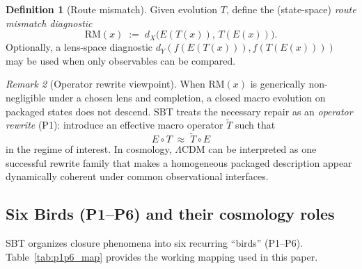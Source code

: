 \documentclass[11pt]{article}
\newcommand{\StateSpace}{X}
\newcommand{\ObsSpace}{Y}
\newcommand{\Lens}{f}              \newcommand{\Completion}{U}        \newcommand{\PackageOp}{E}
\newcommand{\RM}{\mathrm{RM}}      \newcommand{\iddef}{\delta}
\theoremstyle{definition}
\newtheorem{definition}{Definition}[section]
\theoremstyle{plain}
\theoremstyle{remark}
\newtheorem{remark}[definition]{Remark}
\begin{document}
\begin{definition}[Route mismatch]
Given evolution $T$, define the (state-space) \emph{route mismatch diagnostic}
\begin{equation}
\RM(x) \;:=\; d_{\StateSpace}\!\big(\PackageOp(T(x)),\,T(\PackageOp(x))\big).
\label{eq:route_mismatch_def}
\end{equation}
Optionally, a lens-space diagnostic $d_{\ObsSpace}(\Lens(\PackageOp(T(x))),\Lens(T(\PackageOp(x))))$ may be used when only observables can be compared.
\end{definition}

\begin{remark}[Operator rewrite viewpoint]
When $\RM(x)$ is generically non-negligible under a chosen lens and completion, a closed macro evolution on packaged states does not descend.
SBT treats the necessary repair as an \emph{operator rewrite} (P1): introduce an effective macro operator $\widetilde{T}$ such that
\begin{equation}
\PackageOp\circ T \;\approx\; \widetilde{T}\circ \PackageOp
\label{eq:rewrite_condition}
\end{equation}
in the regime of interest.
In cosmology, $\Lambda$CDM can be interpreted as one successful rewrite family that makes a homogeneous packaged description appear dynamically coherent under common observational interfaces.
\end{remark}

\subsection{Six Birds (P1--P6) and their cosmology roles}\label{sec:framework:p1p6}
SBT organizes closure phenomena into six recurring ``birds'' (P1--P6).
Table~\ref{tab:p1p6_map} provides the working mapping used in this paper.
\end{document}

